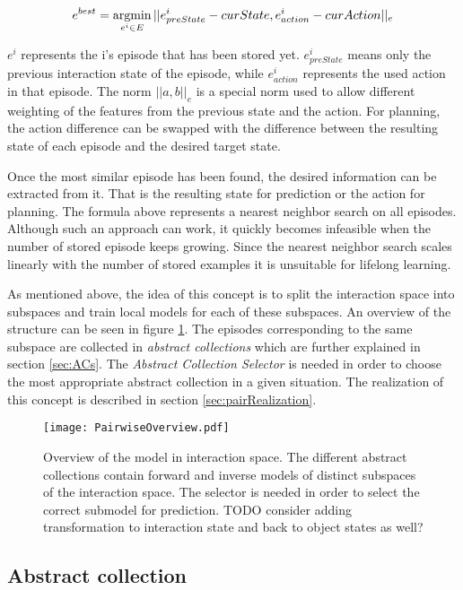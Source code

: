 \begin{equation}
	e^{best} = \argmin_{e^i \in E} ||e^i_{preState}-curState, e^i_{action}-curAction||_e
	\label{eq:bestEpisode}
\end{equation}


$e^i$ represents the i's episode that has been stored yet. $e^i_{preState}$ means only the previous interaction state of the episode, while $e^i_{action}$ represents the used action in that episode.
The norm $||a,b||_e$ is a special norm used to allow different weighting of the features from the previous state and the action. For planning, the action difference can be swapped with the difference between the resulting state of each episode and the desired target state.

Once the most similar episode has been found, the desired information can be extracted from it. That is the resulting state for prediction or the action for planning. The formula above represents a nearest neighbor search on all episodes. Although such an approach can work, it quickly becomes infeasible when the number of stored episode keeps growing. Since the nearest neighbor search scales linearly with the number of stored examples it is unsuitable for lifelong learning. 

As mentioned above, the idea of this concept is to split the interaction space into subspaces and train local models for each of these subspaces. An overview of the structure can be seen in figure \ref{fig:PairOverview}.
The episodes corresponding to the same subspace are collected in \textit{abstract collections} which are further explained in section \ref{sec:ACs}.
The \textit{Abstract Collection Selector} is needed in order to choose the most appropriate abstract collection in a given situation. The realization of this concept is described in section \ref{sec:pairRealization}.

\begin{figure}
	\centering
	\texttt{[image: PairwiseOverview.pdf]}
	\caption{Overview of the model in interaction space. The different abstract collections contain forward and inverse models of distinct subspaces of the interaction space. The selector is needed in order to select the correct submodel for prediction. TODO consider adding transformation to interaction state and back to object states as well?} %
	\label{fig:PairOverview}
\end{figure}

\subsection{Abstract collection \label{sec:ACs}}

